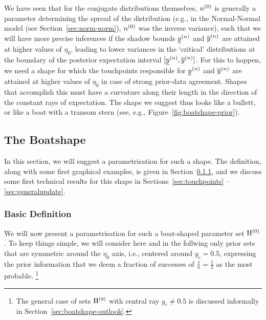 We have seen that for the conjugate distributions themselves,
$n^{(0)}$ is generally a parameter determining the spread of the distribution
(e.g., in the Normal-Normal model (see Section~\ref{sec:norm-norm}), $n^{(0)}$ was the inverse variance),
such that we will have more precise inferences if the shadow bounds $\underline{y}^{(n)}$ and $\overline{y}^{(n)}$
are attained at higher values of $\eta_0$, leading to lower variances in the
`critical' distributions at the boundary of the posterior expectation interval $[\underline{y}^{(n)},\overline{y}^{(n)}]$.
For this to happen, we need a shape for which the touchpoints responsible for $\underline{y}^{(n)}$ and $\overline{y}^{(n)}$
are attained at higher values of $\eta_0$ in case of strong prior-data agreement.
Shapes that accomplish this must have a curvature along their length in the direction
of the constant rays of expectation.
The shape we suggest thus looks like a bullett, or like a boat with a transom stern
(see, e.g., Figure~\ref{fig:boatshape-prior}).

\subsection{The Boatshape}
\label{sec:boatshape-2}

In this section, %
we will suggest a parametrisation for such a shape.
The definition, along with some first graphical examples, is given in Section~\ref{sec:basicdefboat},
and we discuss some first technical results for this shape in Sections~\ref{sec:touchpoints} -- \ref{sec:generalupdate}.

\subsubsection{Basic Definition}
\label{sec:basicdefboat}

We will now present a parametrisation for such a boat-shaped parameter set $\mathrm{H}^{(0)}$.
To keep things simple, we will consider here and in the follwing only prior sets
that are symmetric around the $\eta_0$ axis, i.e., centered around $y_c = 0.5$,
expressing the prior information that we deem a fraction of successes of $\frac{s}{n} = \frac{1}{2}$
as the most probable.%
\footnote{The general case of sets $\mathrm{H}^{(0)}$ with central ray $y_c \neq 0.5$
is discussed informally in Section~\ref{sec:boatshape-outlook}.}

